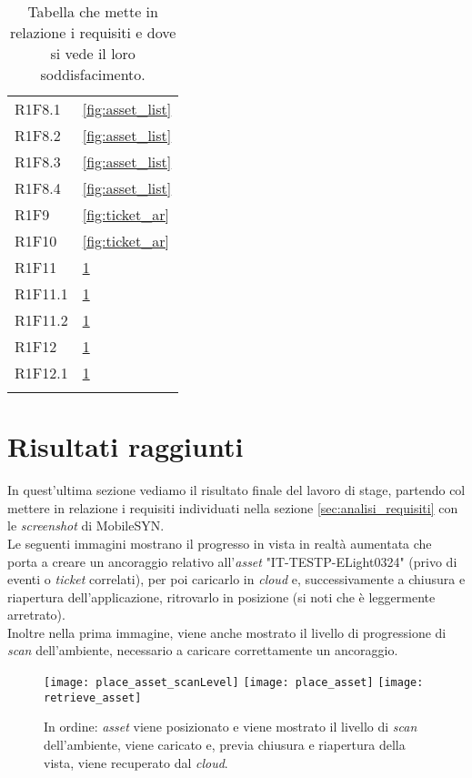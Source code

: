 {\begin{longtable}{C{.3\freewidth} C{.4\freewidth}}
    R1F8.1 & \ref{fig:asset_list}\\
    R1F8.2 & \ref{fig:asset_list}\\
    R1F8.3 &\ref{fig:asset_list}\\
    R1F8.4 & \ref{fig:asset_list}\\
    R1F9 & \ref{fig:ticket_ar}\\
    R1F10 &\ref{fig:ticket_ar}\\ 
    R1F11 &\ref{fig:place_asset} \\
    R1F11.1 & \ref{fig:place_asset}\\
    R1F11.2 & \ref{fig:place_asset}\\
    R1F12 & \ref{fig:place_asset}\\
    R1F12.1 & \ref{fig:place_asset}\\
    
    \bottomrule
    \caption[Tabella requisiti - chi li soddisfa]{Tabella che mette in relazione i requisiti e dove si vede il loro soddisfacimento.}
    \end{longtable}
}

\section{Risultati raggiunti}
In quest'ultima sezione vediamo il risultato finale del lavoro di stage, partendo col mettere in relazione i requisiti individuati nella sezione \ref{sec:analisi_requisiti} con le \textit{screenshot} di MobileSYN.\\
Le seguenti immagini mostrano il progresso in vista in realtà aumentata che porta a creare un ancoraggio relativo all'\textit{asset} "IT-TESTP-ELight0324" (privo di eventi o \textit{ticket} correlati), per poi caricarlo in \textit{cloud} e, successivamente a chiusura e riapertura dell'applicazione, ritrovarlo in posizione (si noti che è leggermente arretrato).\\
Inoltre nella prima immagine, viene anche mostrato il livello di progressione di \textit{scan} dell'ambiente, necessario a caricare correttamente un ancoraggio.

\begin{figure}[H]
  \centering
  \texttt{[image: place\_asset\_scanLevel]}\hfill
  \texttt{[image: place\_asset]}\hfill
  \texttt{[image: retrieve\_asset]}\hfill

  \caption[Creazione, caricamento e recupero di \textit{asset}]{In ordine: \textit{asset} viene posizionato e viene mostrato il livello di \textit{scan} dell'ambiente, viene caricato e, previa chiusura e riapertura della vista, viene recuperato dal \textit{cloud}.}
  \label{fig:place_asset}
\end{figure}


